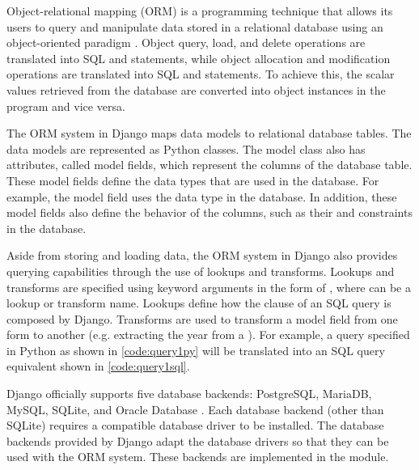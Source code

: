 Object-relational mapping (ORM) is a programming technique that allows its
users to query and manipulate data stored in a relational database using an
object-oriented paradigm \cite{linskey:orm}. Object query, load, and delete
operations are translated into SQL  and  statements,
while object allocation and modification operations are translated into SQL
 and  statements. To achieve this, the scalar values
retrieved from the database are converted into object instances in the program
and vice versa.

The ORM system in Django maps data models to relational database tables. The
data models are represented as Python classes. The model class also has
attributes, called model fields, which represent the columns of the database
table. These model fields define the data types that are used in the database.
For example, the  model field uses the  data type
in the database. In addition, these model fields also define the behavior of
the columns, such as their  and  constraints in the
database.

Aside from storing and loading data, the ORM system in Django also provides
querying capabilities through the use of lookups and transforms. Lookups and
transforms are specified using keyword arguments in the form of
, where  can be a lookup or
transform name. Lookups define how the  clause of an SQL query is
composed by Django. Transforms are used to transform a model field from one
form to another (e.g. extracting the year from a ). For
example, a query specified in Python as shown in \autoref{code:query1py} will
be translated into an SQL query equivalent shown in \autoref{code:query1sql}.





Django officially supports five database backends: PostgreSQL, MariaDB, MySQL,
SQLite, and Oracle Database \cite{django:databases}. Each database backend
(other than SQLite) requires a compatible database driver to be installed. The
database backends provided by Django adapt the database drivers so that they
can be used with the ORM system. These backends are implemented in the
 module.

